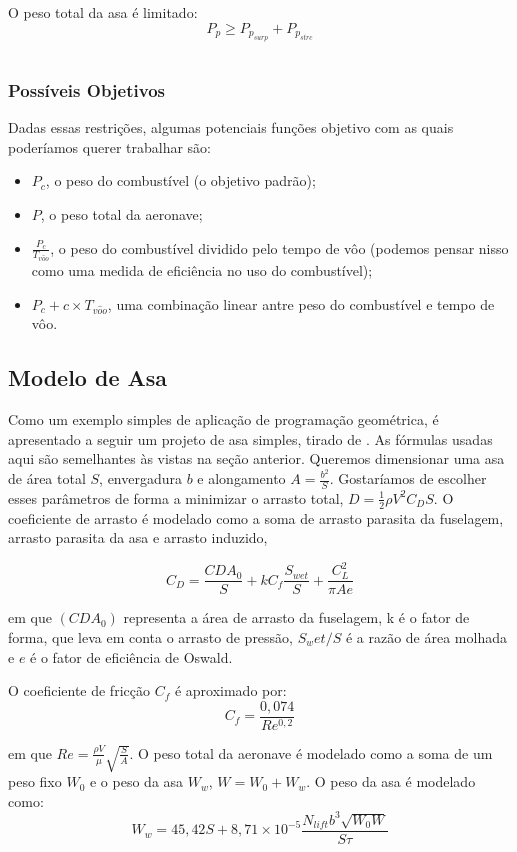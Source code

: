 \documentclass{article}
\begin{document}
O peso total da asa é limitado:
\[
P_p \geq P_{p_{surp}} + P_{p_{strc}}
\]

\inputminted{python}{../Exemplos/Cap15/prog4_wwb.py}

\subsubsection{Possíveis Objetivos}

Dadas essas restrições, algumas potenciais funções objetivo com as
quais poderíamos querer trabalhar são:

\begin{itemize}
\item $P_c$, o peso do combustível (o objetivo padrão);
\item $P$, o peso total da aeronave;
\item $\frac{P_c}{T_{v\hat{o}o}}$, o peso do combustível dividido pelo
  tempo de vôo (podemos pensar nisso como uma medida de eficiência no
  uso do combustível);
\item $P_c + c \times T_{v\hat{o}o}$, uma combinação linear antre peso
  do combustível e tempo de vôo.
\end{itemize}

\subsection{Modelo de Asa}
Como um exemplo simples de aplicação de programação geométrica, é
apresentado a seguir um projeto de asa simples, tirado de
\cite{warren}. As fórmulas usadas aqui são semelhantes às vistas na
seção anterior.  Queremos dimensionar uma asa de área total $S$,
envergadura $b$ e alongamento $A = \frac{b^2}{S}$. Gostaríamos de
escolher esses parâmetros de forma a minimizar o arrasto total, $D =
\frac{1}{2}\rho V^2 C_D S$.  O coeficiente de arrasto é modelado como
a soma de arrasto parasita da fuselagem, arrasto parasita da asa e
arrasto induzido,

\[
C_D = \frac{CDA_0}{S} + kC_f \frac{S_{wet}}{S} + \frac{C_{L}^2}{\pi A
  e}
\]

\noindent em que $(CDA_0)$ representa a área de arrasto da fuselagem,
k é o fator de forma, que leva em conta o arrasto de pressão,
$S_wet/S$ é a razão de área molhada e $e$ é o fator de eficiência de
Oswald.

O coeficiente de fricção $C_f$ é aproximado por:
\[
C_f = \frac{0,074}{Re^{0,2}}
\]

\noindent em que $Re = \frac{\rho V}{\mu} \sqrt{\frac{S}{A}}$. O peso
total da aeronave é modelado como a soma de um peso fixo $W_0$ e o
peso da asa $W_w$, $W = W_0 + W_w$. O peso da asa é modelado como:
\[
W_w = 45,42S + 8,71\times10^{-5} \frac{N_{lift}b^3\sqrt{W_0W}}{S\tau}
\]
\end{document}
